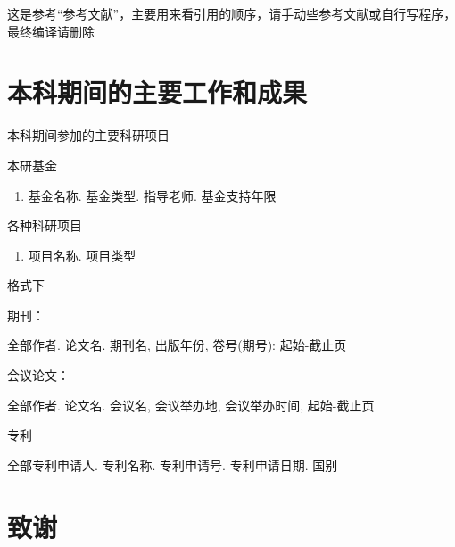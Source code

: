 \documentclass[UTF8,openany,AutoFakeBold,AutoFakeSlant,cs4size]{ctexbook}
\begin{document}


这是参考“参考文献”，主要用来看引用的顺序，请手动些参考文献或自行写程序，最终编译请删除
\clearpage





\linespread{1}\selectfont
\normalsize
\chapter*{本科期间的主要工作和成果}

\noindent 本科期间参加的主要科研项目

\noindent 本研基金
\begin{enumerate}
	\item 基金名称. 基金类型. 指导老师. 基金支持年限
\end{enumerate}

\noindent 各种科研项目
\begin{enumerate}
	\item 项目名称. 项目类型
\end{enumerate}

格式下

期刊：

全部作者. 论文名. 期刊名, 出版年份, 卷号(期号): 起始-截止页

会议论文：

全部作者. 论文名. 会议名, 会议举办地, 会议举办时间, 起始-截止页

专利

全部专利申请人. 专利名称. 专利申请号. 专利申请日期. 国别



{
	\fancyhf{}
	\fancyfoot[CO,CE]{~\thepage~}
	\renewcommand{\headrulewidth}{0.7pt}
	\renewcommand{\footrulewidth}{0pt}
}
\fancyhf{}
\fancyfoot[CO,CE]{~\thepage~}
\renewcommand{\headrulewidth}{0.7pt}
\renewcommand{\footrulewidth}{0pt}
\clearpage





\linespread{1.5}\selectfont
\normalsize
\chapter*{致谢}



{
	\fancyhf{}
	\fancyfoot[CO,CE]{~\thepage~}
	\renewcommand{\headrulewidth}{0.7pt}
	\renewcommand{\footrulewidth}{0pt}
}
\fancyhf{}
\fancyfoot[CO,CE]{~\thepage~}
\renewcommand{\headrulewidth}{0.7pt}
\renewcommand{\footrulewidth}{0pt}
\end{document}
